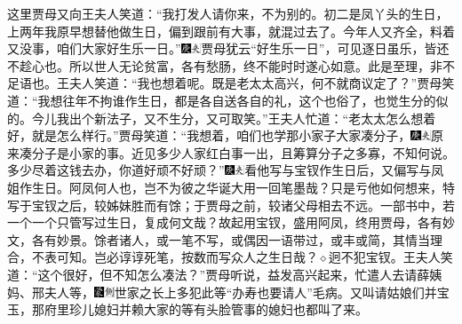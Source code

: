 这里贾母又向王夫人笑道：“我打发人请你来，不为别的。初二是凤丫头的生日，上两年我原早想替他做生日，偏到跟前有大事，就混过去了。今年人又齐全，料着又没事，咱们大家好生乐一日。”{\includegraphics[width=3mm]{../Images/00004}\includegraphics[width=3mm]{../Images/00012}\footnotesize \kaishu 贾母犹云“好生乐一日”，可见逐日虽乐，皆还不趁心也。所以世人无论贫富，各有愁肠，终不能时时遂心如意。此是至理，非不足语也。}王夫人笑道：“我也想着呢。既是老太太高兴，何不就商议定了？”贾母笑道：“我想往年不拘谁作生日，都是各自送各自的礼，这个也俗了，也觉生分的似的。今儿我出个新法子，又不生分，又可取笑。”王夫人忙道：“老太太怎么想着好，就是怎么样行。”贾母笑道：“我想着，咱们也学那小家子大家凑分子，{\includegraphics[width=3mm]{../Images/00004}\includegraphics[width=3mm]{../Images/00012}\footnotesize \kaishu 原来凑分子是小家的事。近见多少人家红白事一出，且筹算分子之多寡，不知何说。}多少尽着这钱去办，你道好顽不好顽？”{\includegraphics[width=3mm]{../Images/00004}\includegraphics[width=3mm]{../Images/00012}\footnotesize \kaishu 看他写与宝钗作生日后，又偏写与凤姐作生日。阿凤何人也，岂不为彼之华诞大用一回笔墨哉？只是亏他如何想来，特写于宝钗之后，较姊妹胜而有馀；于贾母之前，较诸父母相去不远。一部书中，若一个一个只管写过生日，复成何文哉？故起用宝钗，盛用阿凤，终用贾母，各有妙文，各有妙景。馀者诸人，或一笔不写，或偶因一语带过，或丰或简，其情当理合，不表可知。岂必谆谆死笔，按数而写众人之生日哉？{$\diamond$}迥不犯宝钗。}王夫人笑道：“这个很好，但不知怎么凑法？”贾母听说，益发高兴起来，忙遣人去请薛姨妈、邢夫人等，{\includegraphics[width=3mm]{../Images/00006}\includegraphics[width=3mm]{../Images/00011}\footnotesize \kaishu 世家之长上多犯此等“办寿也要请人”毛病。}又叫请姑娘们并宝玉，那府里珍儿媳妇并赖大家的等有头脸管事的媳妇也都叫了来。


